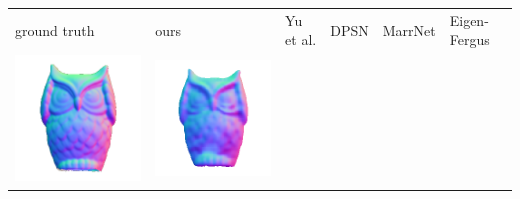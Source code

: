 \begin{center}
\begin{tabularx}{\linewidth}{@{}Y@{}Y@{}Y@{}Y@{}Y@{}Y@{}}
ground truth & ours & Yu et al. & DPSN & MarrNet & Eigen-Fergus \\
\includegraphics[width=\linewidth]{semisynthetic/20160617_15_gt.png} &
\includegraphics[width=\linewidth]{semisynthetic/20160617_15_ours_out.png} &

\end{tabularx}
\end{center}
